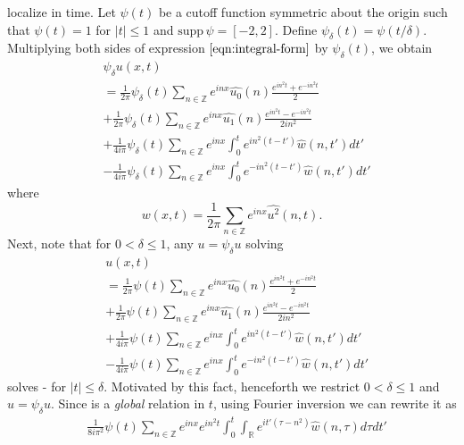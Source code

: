 \documentclass[12pt,reqno]{amsart}
\numberwithin{equation}{section}  %
\renewcommand{\cref}{\Cref}
\newcommand{\rr}{\mathbb{R}}
\newcommand{\zz}{\mathbb{Z}}
\newcommand{\wh}{\widehat}
\begin{document}
localize in time. 
Let $\psi(t)$ be a cutoff function symmetric about the 
origin such that $\psi(t) = 1$ for $|t| \le 1$ and $\text{supp} \, \psi 
= [-2, 2 ]$.
Define $\psi_{\delta}(t) = \psi(t/\delta)$.  Multiplying both sides of expression
$\cref{eqn:integral-form}$ by $\psi_{\delta}(t)$, we obtain
%
%
\begin{align}
  & \psi_{\delta}u(x,t) 
  \label{1hh}
    \\
    & = \frac{1}{2 \pi}\psi_{\delta}(t)
    \sum_{n \in \zz} e^{inx} \wh{u_{0}}(n) \frac{e^{in^{2}t} + e^{-in^{2}t}}{2} 
    \\
    \label{2hh}
    & + \frac{1}{2 \pi}\psi_{\delta}(t) \sum_{n \in \zz} e^{inx}
    \wh{u_{1}}(n)\frac{e^{in^{2}t} - e^{-in^{2}t}}{2 i n^{2}} 
    \\
    \label{3hh}
    & + \frac{1}{4 i \pi}\psi_{\delta}(t) \sum_{n \in \zz} e^{inx}
    \int_{0}^{t}e^{in^{2}(t-t')}
    \wh{w}(n, t') dt'
    \\
    \label{4hh}
    & - \frac{1}{4 i \pi}\psi_{\delta}(t) \sum_{n \in \zz} e^{inx}
    \int_{0}^{t}e^{-in^{2}(t-t')}
    \wh{w}(n, t') dt'
  \end{align}
where $$w(x,t) = \frac{1}{2\pi} \sum_{n \in \zz}
e^{inx} \wh{u^{2}}(n,t).$$  Next, note that for $0 < \delta \le 1$, any $u = \psi_{\delta} u$ solving
\begin{align}
  & u(x,t) 
    \\
    & = \frac{1}{2 \pi}\psi(t)
    \sum_{n \in \zz} e^{inx} \wh{u_{0}}(n) \frac{e^{in^{2}t} + e^{-in^{2}t}}{2} 
    \\
    & + \frac{1}{2 \pi}\psi(t) \sum_{n \in \zz} e^{inx}
    \wh{u_{1}}(n)\frac{e^{in^{2}t} - e^{-in^{2}t}}{2 i n^{2}} 
    \\
    \label{term-3}
    & + \frac{1}{4 i \pi} \psi(t) \sum_{n \in \zz} e^{inx}
    \int_{0}^{t}e^{in^{2}(t-t')}
    \wh{w}(n, t') dt'
    \\
    \label{term-4}
    & - \frac{1}{4 i \pi} \psi (t) \sum_{n \in \zz} e^{inx}
    \int_{0}^{t}e^{-in^{2}(t-t')}
    \wh{w}(n, t') dt'
  \end{align}
  solves \cref{1hh}-\cref{4hh} for $| t | \le \delta$.
  Motivated by this fact, henceforth
  we restrict $0 < \delta
  \le 1$ and $u = \psi_{\delta} u$. Since \cref{term-3} is a \emph{global} relation in
  $t$, using Fourier inversion we can rewrite it as
%
%
\begin{equation*}
\begin{split}
  & \frac{1}{8 i \pi^{2}}  \psi(t) \sum_{n \in \zz} e^{inx} e^{in^{2}t}
  \int_{0}^{t} \int_{\rr} e^{it'(\tau - n^{2})} \wh{w}(n, \tau) d \tau dt'
\end{split}
\end{equation*}
\end{document}
